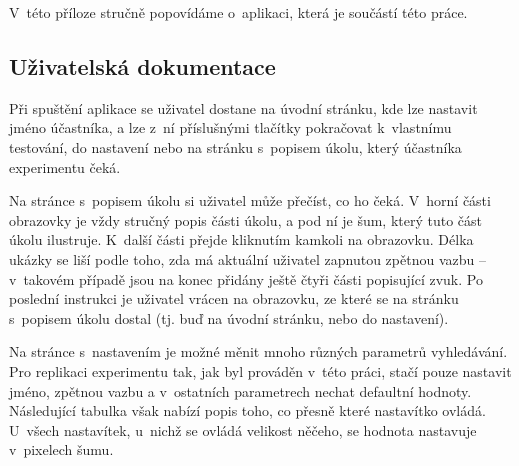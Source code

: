 \newpage
{}

V~této příloze stručně popovídáme o~aplikaci, která je součástí této práce. 

\subsection*{Uživatelská dokumentace}

Při spuštění aplikace se uživatel dostane na úvodní stránku, kde lze nastavit
jméno účastníka, a lze z~ní příslušnými tlačítky pokračovat k~vlastnímu
testování, do nastavení nebo na stránku s~popisem úkolu, který účastníka
experimentu čeká.

Na stránce s~popisem úkolu si uživatel může přečíst, co ho čeká. V~horní části
obrazovky je vždy stručný popis části úkolu, a pod ní je šum, který tuto část
úkolu ilustruje. K~další části přejde kliknutím kamkoli na obrazovku. Délka
ukázky se liší podle toho, zda má aktuální uživatel zapnutou zpětnou vazbu --
v~takovém případě jsou na konec přidány ještě čtyři části popisující zvuk. Po
poslední instrukci je uživatel vrácen na obrazovku, ze které se na stránku
s~popisem úkolu dostal (tj. buď na úvodní stránku, nebo do nastavení).

Na stránce s~nastavením je možné měnit mnoho různých parametrů vyhledávání. Pro
replikaci experimentu tak, jak byl prováděn v~této práci, stačí pouze nastavit
jméno, zpětnou vazbu a v~ostatních parametrech nechat defaultní hodnoty.
Následující tabulka však nabízí popis toho, co přesně které nastavítko ovládá.
U~všech nastavítek, u~nichž se ovládá velikost něčeho,
se hodnota nastavuje v~pixelech šumu.
\bigskip

